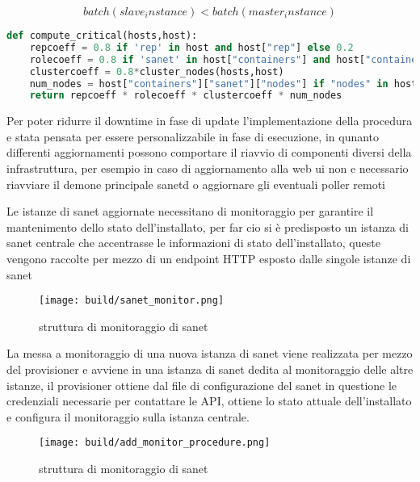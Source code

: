 \begin{equation}
  batch(slave_instance) < batch(master_instance)
\end{equation}

\begin{lstlisting}[language=python]
def compute_critical(hosts,host):
    repcoeff = 0.8 if 'rep' in host and host["rep"] else 0.2
    rolecoeff = 0.8 if 'sanet' in host["containers"] and host["containers"]["sanet"]["role"] == "prod" else 0.2
    clustercoeff = 0.8*cluster_nodes(hosts,host)
    num_nodes = host["containers"]["sanet"]["nodes"] if "nodes" in host["containers"]["sanet"] else 1
    return repcoeff * rolecoeff * clustercoeff * num_nodes
\end{lstlisting}

Per poter ridurre il downtime in fase di update l'implementazione della procedura e stata pensata per essere personalizzabile in fase di esecuzione, in qunanto differenti aggiornamenti possono comportare il riavvio di componenti diversi della infrastruttura, per esempio in caso di aggiornamento alla web ui non e necessario riavviare il demone principale sanetd o aggiornare gli eventuali poller remoti

Le istanze di sanet aggiornate necessitano di monitoraggio per garantire il mantenimento dello stato dell'installato, per far cio si è predisposto un istanza di sanet centrale che accentrasse le informazioni di stato dell'installato, queste vengono raccolte per mezzo di un endpoint HTTP esposto dalle singole istanze di sanet

\begin{figure}[H]
    \centering
    \texttt{[image: build/sanet\_monitor.png]}
    \caption{struttura di monitoraggio di sanet}
    \label{fig:enter-label}
\end{figure}

La messa a monitoraggio di una nuova istanza di sanet viene realizzata per mezzo del provisioner e avviene in una istanza di sanet dedita al monitoraggio delle altre istanze, il provisioner ottiene dal file di configurazione del sanet in questione le credenziali necessarie per contattare le API, ottiene lo stato attuale dell'installato e configura il monitoraggio sulla istanza centrale.

\begin{figure}[H]
    \centering
    \texttt{[image: build/add\_monitor\_procedure.png]}
    \caption{struttura di monitoraggio di sanet}
    \label{fig:enter-label}
\end{figure}




